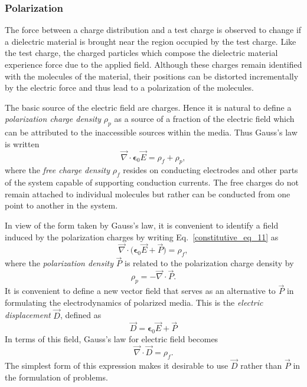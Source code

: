 \documentclass[11pt,a4paper,oneside]{book}
\numberwithin{equation}{section}
\theoremstyle{it}
\theoremstyle{definition}
\begin{document}
\subsubsection{Polarization}
The force between a charge distribution and a test charge is observed to change if a dielectric material is brought near the region occupied by the test charge. Like the test charge, the charged particles which compose the dielectric material experience force due to the applied field. Although these charges remain identified with the molecules of the material, their positions can be distorted incrementally by the electric force and thus lead to a polarization of the molecules.

The basic source of the electric field are charges. Hence it is natural to define a \textit{polarization charge density} $\rho_{p}$ as a source of a fraction of the electric field which can be attributed to the inaccessible sources within the media. Thus Gauss's law is written
 \begin{equation}\label{constitutive_eq_10}
 	\vec{\nabla}\cdot\mathbf{\epsilon}_0\vec{E}=\rho_f+\rho_p,
 \end{equation}
where the \textit{free charge density} $\rho_f$ resides on conducting electrodes and other parts of the system capable of supporting conduction currents. The free charges do not remain attached to individual molecules but rather can be conducted from one point to another in the system.

In view of the form taken by Gauss's law, it is convenient to identify a field induced by the polarization charges by writing Eq.~\eqref{constitutive_eq_11} as 
 \begin{equation}\label{constitutive_eq_11}
	\vec{\nabla}\cdot\big(\mathbf{\epsilon}_0\vec{E}+\vec{P}\big)=\rho_f,
\end{equation}
where the \textit{polarization density} $\vec{P}$ is related to the polarization charge density by
 \begin{equation}\label{constitutive_eq_12}
	\rho_{p}=-\vec{\nabla}\cdot\vec{P}.
\end{equation} 
It is convenient to define a new vector field that serves as an alternative to $\vec{P}$ in formulating the electrodynamics of polarized media. This is the \textit{electric displacement} $\vec{D}$, defined as
 \begin{equation}\label{constitutive_eq_13}
	\vec{D}=\mathbf{\epsilon}_0\vec{E}+\vec{P}
\end{equation}
In terms of this field, Gauss's law for electric field becomes
 \begin{equation}\label{constitutive_eq_14}
	\vec{\nabla}\cdot\vec{D}=\rho_f.
 \end{equation}
The simplest form of this expression makes it desirable to use $\vec{D}$ rather than $\vec{P}$ in the formulation of problems.
\end{document}
